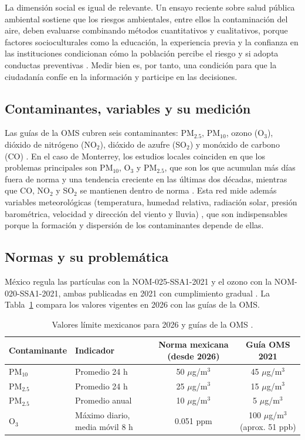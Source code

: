 \documentclass[11pt,letterpaper]{article}
\newcommand{\ugm}{$\mu$g/m$^{3}$}
\begin{document}
La dimensi\'on social es igual de relevante. Un ensayo reciente sobre salud p\'ublica ambiental sostiene que los riesgos ambientales, entre ellos la contaminaci\'on del aire, deben evaluarse combinando m\'etodos cuantitativos y cualitativos, porque factores socioculturales como la educaci\'on, la experiencia previa y la confianza en las instituciones condicionan c\'omo la poblaci\'on percibe el riesgo y si adopta conductas preventivas \cite{sanchez2026}. Medir bien es, por tanto, una condici\'on para que la ciudadan\'ia conf\'ie en la informaci\'on y participe en las decisiones.

\subsection{Contaminantes, variables y su medici\'on}
Las gu\'ias de la OMS cubren seis contaminantes: PM$_{2.5}$, PM$_{10}$, ozono (O$_3$), di\'oxido de nitr\'ogeno (NO$_2$), di\'oxido de azufre (SO$_2$) y mon\'oxido de carbono (CO) \cite{who2021}. En el caso de Monterrey, los estudios locales coinciden en que los problemas principales son PM$_{10}$, O$_3$ y PM$_{2.5}$, que son los que acumulan m\'as d\'ias fuera de norma y una tendencia creciente en las \'ultimas dos d\'ecadas, mientras que CO, NO$_2$ y SO$_2$ se mantienen dentro de norma \cite{fajardo2023}. Esta red mide adem\'as variables meteorol\'ogicas (temperatura, humedad relativa, radiaci\'on solar, presi\'on barom\'etrica, velocidad y direcci\'on del viento y lluvia) \cite{sima_ranges}, que son indispensables porque la formaci\'on y dispersi\'on de los contaminantes depende de ellas.

\subsection{Normas y su problem\'atica}
M\'exico regula las part\'iculas con la NOM-025-SSA1-2021 y el ozono con la NOM-020-SSA1-2021, ambas publicadas en 2021 con cumplimiento gradual \cite{nom025,sinaica}. La Tabla~\ref{tab:normas} compara los valores vigentes en 2026 con las gu\'ias de la OMS.

\begin{table}[h]
\centering
\small
\begin{tabular}{@{}llcc@{}}
\toprule
Contaminante & Indicador & Norma mexicana (desde 2026) & Gu\'ia OMS 2021 \\
\midrule
PM$_{10}$  & Promedio 24 h & 50 \ugm{} & 45 \ugm{} \\
PM$_{2.5}$ & Promedio 24 h & 25 \ugm{} & 15 \ugm{} \\
PM$_{2.5}$ & Promedio anual & 10 \ugm{} & 5 \ugm{} \\
O$_3$ & M\'aximo diario, media m\'ovil 8 h & 0.051 ppm & 100 \ugm{} (aprox. 51 ppb) \\
\bottomrule
\end{tabular}
\caption{Valores l\'imite mexicanos para 2026 \cite{sinaica,universal2025} y gu\'ias de la OMS \cite{who2021,amini2021}.}
\label{tab:normas}
\end{table}
\end{document}
